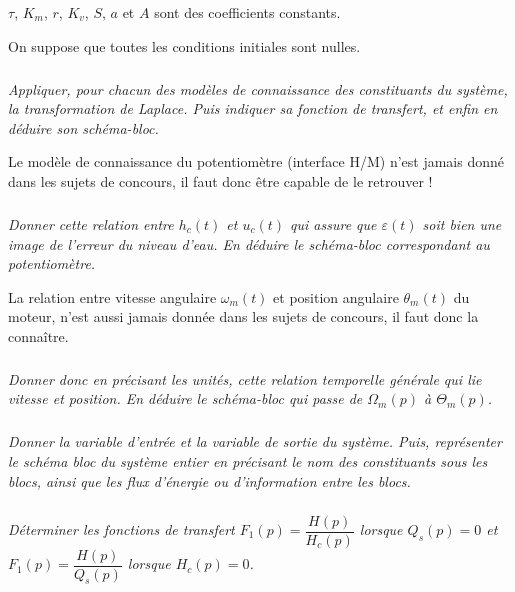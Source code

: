 \documentclass[10pt]{article}
\newif\ifprof
\begin{document}
$\tau$, $K_m$, $r$, $K_v$, $S$, $a$ et $A$ sont des coefficients constants. 

On suppose que toutes les conditions initiales sont nulles.

\subparagraph{}
\textit{Appliquer, pour chacun des modèles de connaissance des constituants du système, la
transformation de Laplace. Puis indiquer sa fonction de transfert, et enfin en déduire son
schéma-bloc.}
\ifprof
\begin{corrige}
\end{corrige}
\else
\fi




Le modèle de connaissance du potentiomètre (interface H/M) n'est jamais donné dans les sujets de
concours, il faut donc être capable de le retrouver !

\subparagraph{}
\textit{Donner cette relation entre $h_c (t)$ et $u_c (t)$ qui assure que $\varepsilon (t)$ soit bien une image de l’erreur
du niveau d’eau. En déduire le schéma-bloc correspondant au potentiomètre.}
\ifprof
\begin{corrige}
\end{corrige}
\else
\fi


La relation entre vitesse angulaire $\omega_m(t)$ et position angulaire $\theta_m(t)$ du moteur, n'est aussi jamais donnée
dans les sujets de concours, il faut donc la connaître.

\subparagraph{}
\textit{Donner donc en précisant les unités, cette relation temporelle générale qui lie vitesse et
position. En déduire le schéma-bloc qui passe de $\Omega_m(p)$ à $\Theta_m(p)$.}
\ifprof
\begin{corrige}
\end{corrige}
\else
\fi



\subparagraph{}
\textit{Donner la variable d’entrée et la variable de sortie du système. Puis, représenter le schéma bloc du système entier en précisant le nom des constituants sous les blocs, ainsi que les flux
d’énergie ou d’information entre les blocs.}
\ifprof
\begin{corrige}
\end{corrige}
\else
\fi


\subparagraph{}
\textit{Déterminer les fonctions de transfert $F_1(p)=\dfrac{H(p)}{H_c(p)}$ lorsque $Q_s(p)=0$ et $F_1(p)=\dfrac{H(p)}{Q_s(p)}$ lorsque $H_c(p)=0$.}

\ifprof
\begin{corrige}
\end{corrige}
\else
\fi
\end{document}
